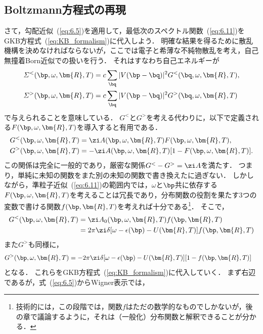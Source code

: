\documentclass[a4paper,10pt]{jsarticle}
\begin{document}
\subsection{\label{sec:6.3}Boltzmann方程式の再現}
さて，勾配近似~(\ref{eq:6.5})を適用して，最低次のスペクトル関数~(\ref{eq:6.11})をGKB方程式~(\ref{eq:KB_formalism})に代入しよう．
明確な結果を得るために散乱機構を決めなければならないが，ここでは電子と希薄な不純物散乱を考え，自己無撞着Born近似での扱いを行う．
それはすなわち自己エネルギーが
\begin{align}
\varSigma^{<} (\bp, \omega, \bm{R}, T)
	& = c \sum_{\bq} | V (\bp - \bq) |^2 G^{<} (\bq, \omega, \bm{R}, T)
, \notag \\
\varSigma^{>} (\bp, \omega, \bm{R}, T)
	& = c \sum_{\bq} | V (\bp - \bq) |^2 G^{>} (\bq, \omega, \bm{R}, T)
\end{align}
で与えられることを意味している．
$G^{<}$と$G^{>}$を考える代わりに，以下で定義される$F (\bp, \omega, \bm{R}, T)$を導入すると有用である．
\begin{align}
G^{<} (\bp, \omega, \bm{R}, T)
	& = \zi A (\bp, \omega, \bm{R}, T) F (\bp, \omega, \bm{R}, T)
, \notag \\
G^{>} (\bp, \omega, \bm{R}, T)
	& = - \zi A (\bp, \omega, \bm{R}, T) [ 1 - F (\bp, \omega, \bm{R}, T) ]
.\end{align}
この関係は完全に一般的であり，厳密な関係$G^{<} - G^{>} = \zi A$を満たす．
つまり，単純に未知の関数をまた別の未知の関数で書き換えたに過ぎない．
しかしながら，準粒子近似~(\ref{eq:6.11})の範囲内では，$\omega$と$\bp$共に依存する$F (\bp, \omega, \bm{R}, T)$を考えることは冗長であり，分布関数の役割を果たす3つの変数で書ける関数$f (\bp, \bm{R}, T)$を考えれば十分である\footnote{技術的には，この段階では，関数$f$はただの数学的なものでしかないが，後の章で議論するように，それは（一般化）分布関数と解釈できることが分かる．}．
そこで，
\begin{align}
G^{<} (\bp, \omega, \bm{R}, T)
	& = \zi A_0 (\bp, \omega, \bm{R}, T) f (\bp, \bm{R}, T)
\notag \\
	& = 2 \pi \zi \delta [ \omega - \epsilon (\bp) - U (\bm{R}, T) ] f (\bp, \bm{R}, T)
\end{align}
また$G^{>}$も同様に，
\begin{align*}
G^{>} (\bp, \omega, \bm{R}, T)
	& = - 2 \pi \zi \delta [ \omega - \epsilon (\bp) - U (\bm{R}, T) ] [ 1 - f (\bp, \bm{R}, T) ]
\end{align*}
となる．
これらをGKB方程式~(\ref{eq:KB_formalism})に代入していく．
まず右辺であるが，式~(\ref{eq:6.5})からWigner表示では，
\end{document}
